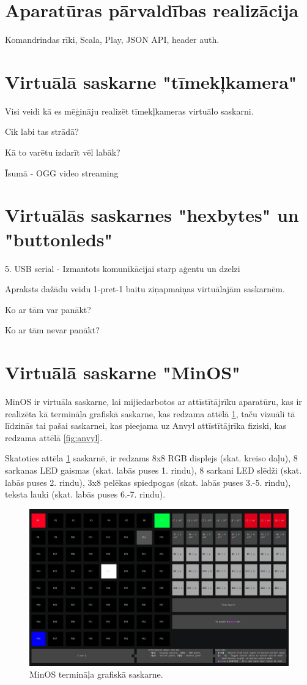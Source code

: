 \section{Aparatūras pārvaldības realizācija}
\label{sec:hwmgmt}

Komandrindas rīki, Scala, Play, JSON API, header auth.

\section{Virtuālā saskarne "tīmekļkamera"}
\label{sec:vinweb}

Visi veidi kā es mēģināju realizēt tīmekļkameras virtuālo saskarni.

Cik labi tas strādā?

Kā to varētu izdarīt vēl labāk?

Īsumā - OGG video streaming

\section{Virtuālās saskarnes "hexbytes" un "buttonleds"}
\label{sec:vinbytes}

5. USB serial - Izmantots komunikācijai starp aģentu un dzelzi


Apraksts dažādu veidu 1-pret-1 baitu ziņapmaiņas virtuālajām saskarnēm.

Ko ar tām var panākt?

Ko ar tām nevar panākt?

\section{Virtuālā saskarne "MinOS"}
\label{sec:vinminos}

MinOS ir virtuāla saskarne, lai mijiedarbotos ar attīstītājrīku aparatūru, kas
ir realizēta kā termināļa grafiskā saskarne, kas redzama attēlā
\ref{fig:minosgui}, taču vizuāli tā līdzinās tai pašai saskarnei, kas pieejama
uz Anvyl attīstītājrīka fiziski, kas redzama attēlā \ref{fig:anvyl}. 

Skatoties attēla \ref{fig:minosgui} saskarnē, ir redzams 8x8 RGB displejs (skat.
kreiso daļu), 8 sarkanas LED gaismas (skat. labās puses 1. rindu), 8 sarkani LED
slēdži (skat. labās puses 2. rindu), 3x8 pelēkas spiedpogas (skat. labās puses
3.-5. rindu), teksta lauki (skat. labās puses 6.-7. rindu). 

\begin{figure}[H]
    \includegraphics[width=0.7\linewidth]{assets/min-os-execution.png}
    \centering
    \caption{MinOS termināļa grafiskā saskarne.}
    \label{fig:minosgui}
\end{figure}

